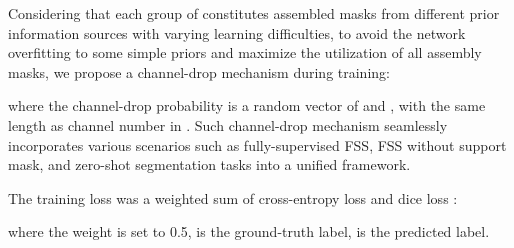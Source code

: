 \documentclass[lettersize,journal]{IEEEtran}
\begin{document}
Considering that each group of  constitutes assembled masks from different prior information sources with varying learning difficulties, to avoid the network overfitting to some simple priors and maximize the utilization of all assembly masks, we propose a channel-drop mechanism during training:

where the channel-drop probability  is a random vector of  and , with the same length as channel number in . Such channel-drop mechanism seamlessly incorporates various scenarios such as fully-supervised FSS, FSS without support mask, and zero-shot segmentation tasks into a unified framework. 


The training loss  was a weighted sum of cross-entropy loss  and dice loss :



where the weight  is set to 0.5,  is the ground-truth label,  is the predicted label. 
\end{document}
